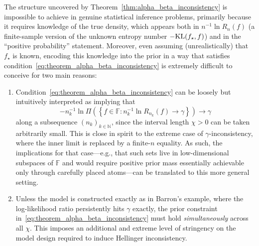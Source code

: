 \documentclass[11pt,twoside]{article}
\newcommand{\kl}{\textnormal{KL}}
\def\NN{\mathbb{N}}
\def\FF{\mathbb{F}}
\def\FF{\mathbb{F}}
\begin{document}



The structure uncovered by Theorem~\ref{thm:alpha_beta_inconsistency} is impossible to achieve in genuine statistical inference problems, primarily because it requires knowledge of the true density, which appears both in $n^{-1}\ln R_n(f)$ (a finite-sample version of the unknown entropy number $-\kl(f_\star,f)$) and in the ``positive probability'' statement. Moreover, even assuming (unrealistically) that $f_\star$ is known, encoding this knowledge into the prior in a way that satisfies condition~\eqref{eq:theorem_alpha_beta_inconsistency} is extremely difficult to conceive for two main reasons:
%
\begin{enumerate}
    \item Condition~\eqref{eq:theorem_alpha_beta_inconsistency} can be loosely but intuitively interpreted as implying that
    \begin{equation*}\label{unreal}
         -n_k^{-1}\ln\Pi\left(\left\{f\in\FF :  n_k^{-1}\ln R_{n_k}(f) \to \gamma \right\} \right) \to \gamma
    \end{equation*}
    along a subsequence $(n_k)_{k\in\NN}$, since the interval length $\chi>0$ can be taken arbitrarily small. This is close in spirit to the extreme case of $\gamma$-inconsistency, where the inner limit is replaced by a finite-$n$ equality. As such, the implications for that case---e.g., that such sets live in low-dimensional subspaces of $\FF$ and would require positive prior mass essentially achievable only through carefully placed atoms---can be translated to this more general setting. %

    \item Unless the model is constructed exactly as in Barron’s example, where the log-likelihood ratio persistently hits $\gamma$ exactly, the prior constraint in~\eqref{eq:theorem_alpha_beta_inconsistency} must hold \emph{simultaneously} across all $\chi$. This imposes an additional and extreme level of stringency on the model design required to induce Hellinger inconsistency.
\end{enumerate}
\end{document}
